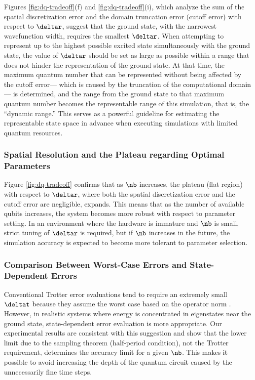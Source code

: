 \documentclass[manuscript_main.tex]{subfiles}
\begin{document}
Figures \ref{fig:dq-tradeoff}(f) and \ref{fig:dq-tradeoff}(i), which analyze the
sum of the spatial discretization error and the domain truncation error (cutoff
error) with respect to $\deltar$, suggest that the ground state, with the
narrowest wavefunction width, requires the smallest $\deltar$. When attempting
to represent up to the highest possible excited state simultaneously with the
ground state, the value of $\deltar$ should be set as large as possible within a
range that does not hinder the representation of the ground state. At that time,
the maximum quantum number that can be represented without being affected by the
cutoff error--- which is caused by the truncation of the computational domain---
is determined, and the range from the ground state to that maximum quantum
number becomes the representable range of this simulation, that is, the
``dynamic range.'' This serves as a powerful guideline for estimating the
representable state space in advance when executing simulations with limited
quantum resources.

\subsubsection{Spatial Resolution and the Plateau regarding Optimal Parameters}
Figure \ref{fig:dq-tradeoff} confirms that as $\nb$ increases, the plateau (flat
region) with respect to $\deltar$, where both the spatial discretization error
and the cutoff error are negligible, expands. This means that as the number of
available qubits increases, the system becomes more robust with respect to
parameter setting. In an environment where the hardware is immature and $\nb$ is
small, strict tuning of $\deltar$ is required, but if $\nb$ increases in the
future, the simulation accuracy is expected to become more tolerant to
parameter selection.

\subsubsection{Comparison Between Worst-Case Errors and State-Dependent Errors}
Conventional Trotter error evaluations tend to require an extremely small
$\deltat$ because they assume the worst case based on the operator norm
\cite{Burgarth2024.PhysRevResearch.6.043155}. However, in realistic systems
where energy is concentrated in eigenstates near the ground state,
state-dependent error evaluation is more appropriate. Our experimental results
are consistent with this suggestion and show that the lower limit due to the
sampling theorem (half-period condition), not the Trotter requirement,
determines the accuracy limit for a given $\nb$. This makes it possible to avoid
increasing the depth of the quantum circuit caused by the unnecessarily fine
time steps.
\end{document}
